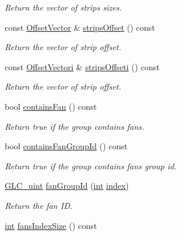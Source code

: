 \begin{DoxyCompactItemize}
\begin{DoxyCompactList}\small\item\em Return the vector of strips sizes. \end{DoxyCompactList}\item 
const \hyperlink{glc__global_8h_a3edb58ebf0cc44d83eec31a509175651}{Offset\-Vector} \& \hyperlink{class_g_l_c___primitive_group_a4a7d8ea7fabb5b9e87f2b49cd9935d32}{strips\-Offset} () const 
\begin{DoxyCompactList}\small\item\em Return the vector of strip offset. \end{DoxyCompactList}\item 
const \hyperlink{glc__global_8h_a023e9bc3950160925c44bfc2f093f25b}{Offset\-Vectori} \& \hyperlink{class_g_l_c___primitive_group_a36a77fbb1bb1df87c4ac1906f055b113}{strips\-Offseti} () const 
\begin{DoxyCompactList}\small\item\em Return the vector of strip offset. \end{DoxyCompactList}\item 
bool \hyperlink{class_g_l_c___primitive_group_ace5be0f34072c45f778f9c136a0eb2ad}{contains\-Fan} () const 
\begin{DoxyCompactList}\small\item\em Return true if the group contains fans. \end{DoxyCompactList}\item 
bool \hyperlink{class_g_l_c___primitive_group_aeacb207a349e920553060f53e38fd120}{contains\-Fan\-Group\-Id} () const 
\begin{DoxyCompactList}\small\item\em Return true if the group contains fans group id. \end{DoxyCompactList}\item 
\hyperlink{glc__global_8h_abf950976fabed69026558df8e2da6c6b}{G\-L\-C\-\_\-uint} \hyperlink{class_g_l_c___primitive_group_a4bd5395c5ccb3d7161de0c4fa0881799}{fan\-Group\-Id} (\hyperlink{ioapi_8h_a787fa3cf048117ba7123753c1e74fcd6}{int} \hyperlink{glext_8h_ab47dd9958bcadea08866b42bf358e95e}{index})
\begin{DoxyCompactList}\small\item\em Return the fan I\-D. \end{DoxyCompactList}\item 
\hyperlink{ioapi_8h_a787fa3cf048117ba7123753c1e74fcd6}{int} \hyperlink{class_g_l_c___primitive_group_a00bfc547eb831452e5e4a76b5b97cfb4}{fans\-Index\-Size} () const 

\end{DoxyCompactItemize}

